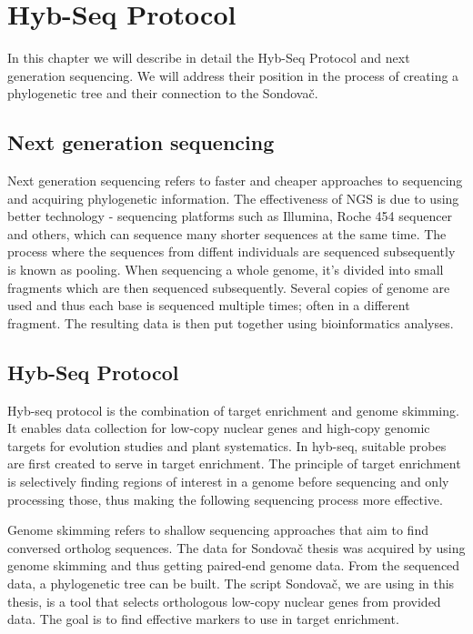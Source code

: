 \chapter[Hyb-Seq Protocol]{Hyb-Seq Protocol}
\label{kap:hyb_seq}

In this chapter we will describe in detail the Hyb-Seq Protocol and next generation sequencing. We will address their position in the process of creating a phylogenetic tree and their connection 
to the Sondovač. 

\section{Next generation sequencing}
Next generation sequencing refers to faster and cheaper approaches to sequencing and acquiring phylogenetic information. The effectiveness of NGS is due to using better technology - sequencing platforms 
such as Illumina, Roche 454 sequencer and others, which can sequence many shorter sequences at the same time. The process where the sequences from diffent individuals are sequenced subsequently is known as pooling. 
\cite {anand2016next}
When sequencing a whole genome, it's divided into small fragments which are then sequenced subsequently. Several copies of genome are used and thus each base is sequenced multiple times; often in a different fragment. The resulting data is then put together using bioinformatics analyses. 
\cite {behjati2013next}

\section{Hyb-Seq Protocol}
Hyb-seq protocol is the combination of target enrichment and genome skimming. It enables data collection for low-copy nuclear genes and high-copy genomic targets for 
evolution studies and plant systematics. In hyb-seq, suitable probes are first created to serve in target enrichment. The principle of target enrichment is selectively finding regions of interest in a genome before sequencing and only processing those, thus making the following sequencing process more effective. 
\cite {weitemier2014hyb}

Genome skimming refers to shallow sequencing approaches that aim to find conversed ortholog sequences. The data for Sondovač thesis was acquired by using genome skimming and thus getting paired-end genome data. 
\cite {denver2016genome}
From the sequenced data, a phylogenetic tree can be built. 
The script Sondovač, we are using in this thesis, is a tool that selects orthologous low-copy nuclear genes from provided data. The goal is to find effective markers to use in target enrichment. 
\cite {sondovac}


